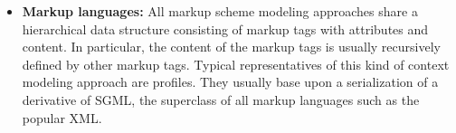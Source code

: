 \begin{itemize}

\item \textbf{Markup languages: } All markup scheme modeling approaches share a hierarchical data structure consisting of markup tags with attributes and content. In particular, the content of the markup tags is usually recursively defined by other markup tags. Typical representatives of this kind of context modeling approach are profiles. They usually base upon a serialization of a derivative of \ac{SGML}, the superclass of all markup languages such as the popular \ac{XML}\cite{Strang2004}.

\end{itemize}




